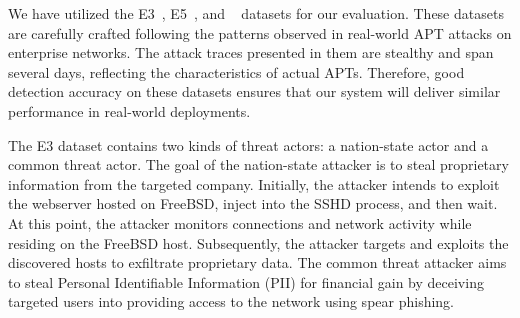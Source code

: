 
 We have utilized the \darpa E3~\cite{error3}, E5~\cite{bug5}, and \optc~\cite{darpaoptc} datasets for our evaluation. These datasets are carefully crafted following the patterns observed in real-world APT attacks on enterprise networks. The attack traces presented in them are stealthy and span several days, reflecting the characteristics of actual APTs. Therefore, good detection accuracy on these datasets ensures that our system will deliver similar performance in real-world deployments.

The E3 dataset contains two kinds of threat actors: a nation-state actor and a common threat actor. The goal of the nation-state attacker is to steal proprietary information from the targeted company. Initially, the attacker intends to exploit the webserver hosted on FreeBSD, inject into the SSHD process, and then wait. At this point, the attacker monitors connections and network activity while residing on the FreeBSD host. Subsequently, the attacker targets and exploits the discovered hosts to exfiltrate proprietary data. The common threat attacker aims to steal Personal Identifiable Information (PII) for financial gain by deceiving targeted users into providing access to the network using spear phishing.

